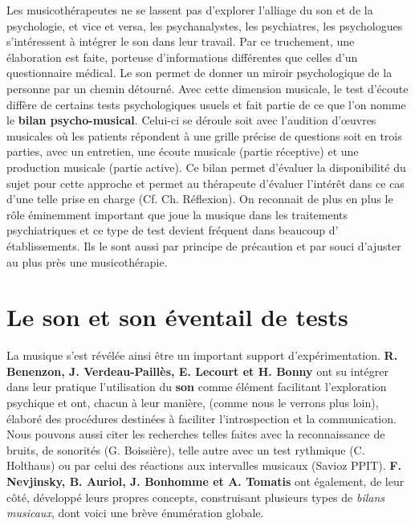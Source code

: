 Les musicothérapeutes ne se lassent pas d'explorer l'alliage du son
 et de la psychologie, et vice
 et versa, les psychanalystes, les psychiatres, les psychologues
 s'intéressent à intégrer le son dans leur travail. Par ce truchement,
 une élaboration est faite, porteuse d'informations différentes que
 celles d'un questionnaire médical. Le son permet de donner un miroir
 psychologique de la personne par un chemin détourné. Avec cette dimension
 musicale, le test d'écoute diffère de certains tests psychologiques usuels
 et fait partie de ce que l'on nomme le \textbf{ bilan
   psycho-musical}. Celui-ci se déroule soit avec l'audition d'\oe uvres
 musicales où les patients répondent à une grille précise de questions
  soit en trois parties, avec un entretien,
 une écoute musicale (partie réceptive) et une production musicale
 (partie active).
Ce bilan permet d'évaluer la disponibilité du sujet pour cette
approche et permet au thérapeute d'évaluer l'intérêt dans ce cas
d'une telle prise en charge (Cf. Ch. Réflexion).
 On reconnait de plus en plus le rôle éminemment important que joue la musique
 dans les traitements psychiatriques et ce type de test devient
 fréquent dans beaucoup d' établissements. Ils le sont aussi par principe de précaution et
 par souci d'ajuster au plus près une
 musicothérapie.




\section{Le son et son éventail de tests}
\label{musicothEtpsycho}

	 La musique s'est révélée ainsi être un important support
         d'expérimentation.   \textbf{R. Benenzon, J. Verdeau-Paillès, E.
         Lecourt et H. Bonny} ont su intégrer dans leur pratique l'utilisation du\textbf{ son }comme
         élément facilitant l'exploration psychique et
         ont, chacun à leur manière, (comme nous le verrons plus loin), élaboré des procédures destinées à faciliter
         l'introspection et la communication. Nous pouvons aussi citer les recherches telles faites avec la reconnaissance de
bruits, de sonorités (G. Boissière), telle autre avec un test rythmique
(C. Holthaus) ou par celui
des réactions aux intervalles musicaux (Savioz PPIT).
\textbf{F. Nevjinsky, B. Auriol, J. Bonhomme
           et A. Tomatis} ont également, de leur côté, développé leurs propres
           concepts, construisant plusieurs types de \emph{bilans musicaux},
           dont voici une brève énumération globale.


